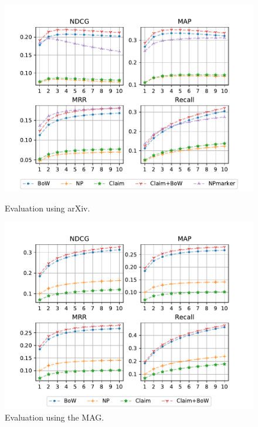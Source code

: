 \begin{figure}
  \centering
    \includegraphics[width=.9\textwidth]{figures/evaluation/arXiv_CS_select.pdf}
  \caption{Evaluation using arXiv.}
  \label{fig:evalarxiv}

  \centering
    \includegraphics[width=.9\textwidth]{figures/evaluation/MAG_CS_en_wAbs.pdf}
  \caption{Evaluation using the MAG.}
  \label{fig:evalmag}
\end{figure}

